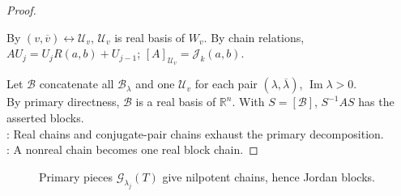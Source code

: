 \begin{theorem}
\begin{proof}
\begin{enumerate}[label=(\roman*)]
By $(v,\overline v)\leftrightarrow\mathcal{U}_v$, $\mathcal{U}_v$ is real basis of $W_v$. By chain relations, $AU_j=U_jR(a,b)+U_{j-1}$; $[A]_{\mathcal{U}_v}=\mathcal{J}_k(a,b)$.
\end{enumerate}
Let $\mathcal{B}$ concatenate all $\mathcal{B}_{\lambda}$ and one $\mathcal{U}_v$ for each pair $(\lambda,\overline\lambda)$, $\operatorname{Im}\lambda>0$.\\
By primary directness, $\mathcal{B}$ is a real basis of $\mathbb{R}^n$. With $S=[\mathcal{B}]$, $S^{-1}AS$ has the asserted blocks.\\
: Real chains and conjugate-pair chains exhaust the primary decomposition.\\
: A nonreal chain becomes one real block chain.
\end{proof}
\end{theorem}

\begin{figure}[H]
  \centering
  
  \caption{Primary pieces $\mathcal{G}_{\lambda_j}(T)$ give nilpotent chains, hence Jordan blocks.}
  \label{fig:jordan-form-primary-chains}
\end{figure}

